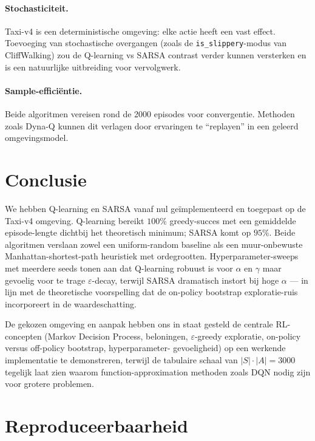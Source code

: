 \documentclass[11pt,a4paper]{article}
\begin{document}
\paragraph{Stochasticiteit.} Taxi-v4 is een deterministische
omgeving: elke actie heeft een vast effect. Toevoeging van stochastische
overgangen (zoals de \texttt{is\_slippery}-modus van CliffWalking) zou
de Q-learning vs SARSA contrast verder kunnen versterken en is een
natuurlijke uitbreiding voor vervolgwerk.

\paragraph{Sample-effici\"entie.} Beide algoritmen vereisen rond de
2000 episodes voor convergentie. Methoden zoals Dyna-Q
\cite[\S 8.2]{sutton_barto_2018} kunnen dit verlagen door
ervaringen te ``replayen'' in een geleerd omgevingsmodel.

\section{Conclusie}

We hebben Q-learning en SARSA vanaf nul ge\"implementeerd en toegepast op
de Taxi-v4 omgeving. Q-learning bereikt $100\%$ greedy-succes met een
gemiddelde episode-lengte dichtbij het theoretisch minimum; SARSA komt
op $95\%$. Beide algoritmen verslaan zowel een uniform-random baseline
als een muur-onbewuste Manhattan-shortest-path heuristiek met
ordegrootten. Hyperparameter-sweeps met meerdere seeds tonen aan dat
Q-learning robuust is voor $\alpha$ en $\gamma$ maar gevoelig voor te
trage $\varepsilon$-decay, terwijl SARSA dramatisch instort bij hoge
$\alpha$ --- in lijn met de theoretische voorspelling dat de on-policy
bootstrap exploratie-ruis incorporeert in de waardeschatting.

De gekozen omgeving en aanpak hebben ons in staat gesteld de centrale
RL-concepten (Markov Decision Process, beloningen, $\varepsilon$-greedy
exploratie, on-policy versus off-policy bootstrap, hyperparameter-
gevoeligheid) op een werkende implementatie te demonstreren, terwijl
de tabulaire schaal van $|S| \cdot |A| = 3000$ tegelijk laat zien
waarom function-approximation methoden zoals DQN nodig zijn voor grotere
problemen.

\section*{Reproduceerbaarheid}
\end{document}
